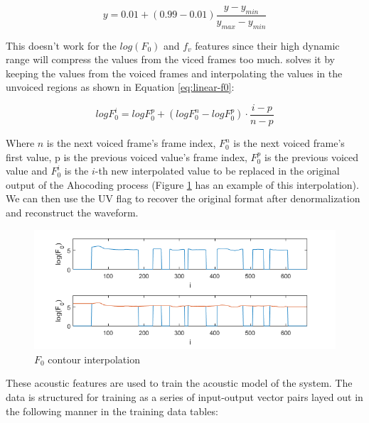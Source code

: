 \begin{equation}
    y = 0.01 + (0.99 - 0.01) \frac{y - y_{min}}{y_{max} - y_{min}}
    \label{eq:out-norm}
\end{equation}

This doesn't work for the $log(F_0)$ and $f_v$ features since their high dynamic range will compress the values from the viced frames too much. \cite{santi06} solves it by keeping the values from the voiced frames and interpolating the values in the unvoiced regions as shown in Equation \ref{eq:linear-f0}:

\begin{equation}
    log F_0^i = log F_0^p + (log F_0^n - log F_0^p) \cdot \frac{i-p}{n-p}
    \label{eq:linear-f0}
\end{equation}

Where $n$ is the next voiced frame's frame index, $F_0^n$ is the next voiced frame's first value, p is the previous voiced value's frame index, $F_0^p$ is the previous voiced value and $F_0^i$ is the $i$-th new interpolated value to be replaced in the original output of the Ahocoding process (Figure \ref{fig:f0-int} has an example of this interpolation). We can then use the UV flag to recover the original format after denormalization and reconstruct the waveform.

\begin{figure}
    \centering
    \includegraphics[width=12cm]{figures/f0.png}
    \caption{$F_0$ contour interpolation}
    \label{fig:f0-int}
\end{figure}


These acoustic features are used to train the acoustic model of the system. The data is structured for training as a series of input-output vector pairs layed out in the following manner in the training data tables:

